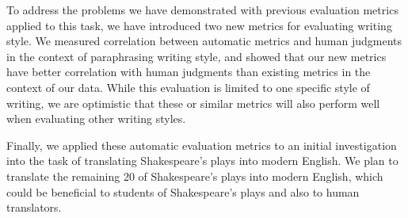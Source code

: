 \documentclass[10pt,a5paper,twoside]{article}
\begin{document}
To address the problems we have demonstrated with previous evaluation metrics applied to this task, we have introduced two new metrics for evaluating writing style.
We measured correlation between automatic metrics and human judgments in the context of paraphrasing writing style, and showed
that our new metrics have better correlation with human judgments than existing metrics in the context of our data.
While this evaluation is limited to one specific style of writing, we are optimistic that these or similar metrics will also perform well when
evaluating other writing styles.

Finally, we applied these automatic evaluation metrics to an initial investigation into the task of translating Shakespeare's plays into modern English.
We plan to translate the remaining 20 of Shakespeare's plays into modern English, which could be beneficial to students
of Shakespeare's plays and also to human translators.





\end{document}
